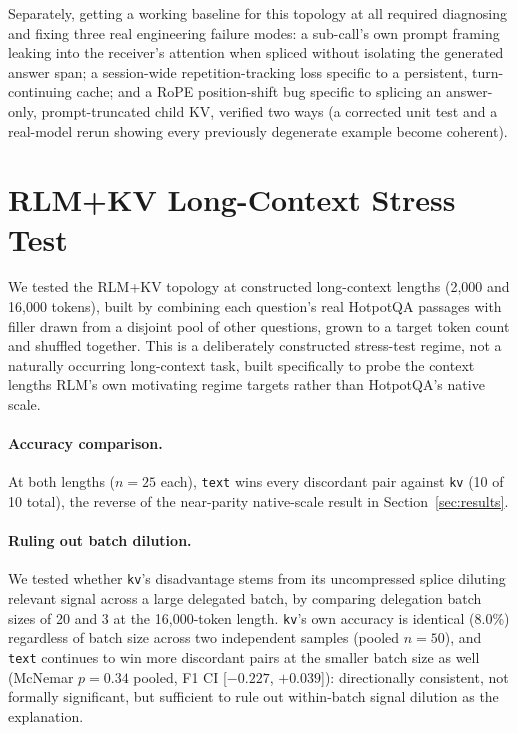\documentclass[11pt]{article}
\begin{document}
Separately, getting a working baseline for this topology at all
required diagnosing and fixing three real engineering failure modes: a
sub-call's own prompt framing leaking into the receiver's attention
when spliced without isolating the generated answer span; a
session-wide repetition-tracking loss specific to a persistent,
turn-continuing cache; and a RoPE position-shift bug specific to
splicing an answer-only, prompt-truncated child KV, verified two ways
(a corrected unit test and a real-model rerun showing every previously
degenerate example become coherent).

\section{RLM+KV Long-Context Stress Test}
\label{app:longcontext}

We tested the RLM+KV topology at constructed long-context lengths
(2,000 and 16,000 tokens), built by combining each question's real
HotpotQA passages with filler drawn from a disjoint pool of other
questions, grown to a target token count and shuffled together. This
is a deliberately constructed stress-test regime, not a naturally
occurring long-context task, built specifically to probe the context
lengths RLM's own motivating regime targets rather than HotpotQA's
native scale.

\paragraph{Accuracy comparison.} At both lengths ($n=25$ each),
\texttt{text} wins every discordant pair against \texttt{kv} (10 of
10 total), the reverse of the near-parity native-scale result in
Section~\ref{sec:results}.

\paragraph{Ruling out batch dilution.} We tested whether \texttt{kv}'s
disadvantage stems from its uncompressed splice diluting relevant
signal across a large delegated batch, by comparing delegation batch
sizes of 20 and 3 at the 16,000-token length. \texttt{kv}'s own
accuracy is identical (8.0\%) regardless of batch size across two
independent samples (pooled $n=50$), and \texttt{text} continues to
win more discordant pairs at the smaller batch size as well (McNemar
$p=0.34$ pooled, F1 CI [$-0.227$, $+0.039$]): directionally
consistent, not formally significant, but sufficient to rule out
within-batch signal dilution as the explanation.
\end{document}
